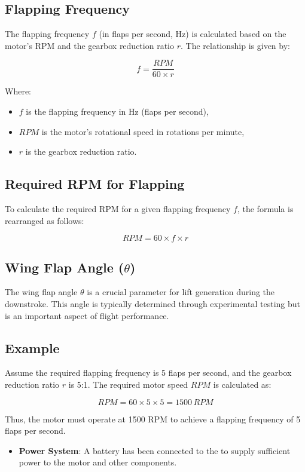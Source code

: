 \subsection{Flapping Frequency}
The flapping frequency $f$ (in flaps per second, Hz) is calculated based on the motor's RPM and the gearbox reduction ratio $r$. The relationship is given by:

\[ f = \frac{RPM}{60 \times r} \]

Where:
\begin{itemize}
    \item $f$ is the flapping frequency in Hz (flaps per second),
    \item $RPM$ is the motor's rotational speed in rotations per minute,
    \item $r$ is the gearbox reduction ratio.
\end{itemize}

\subsection{Required RPM for Flapping}
To calculate the required RPM for a given flapping frequency $f$, the formula is rearranged as follows:

\[ RPM = 60 \times f \times r \]

\subsection{Wing Flap Angle ($\theta$)}
The wing flap angle $\theta$ is a crucial parameter for lift generation during the downstroke. This angle is typically determined through experimental testing but is an important aspect of flight performance.

\subsection{Example}
Assume the required flapping frequency is 5 flaps per second, and the gearbox reduction ratio $r$ is 5:1. The required motor speed $RPM$ is calculated as:

\[ RPM = 60 \times 5 \times 5 = 1500\,RPM \]

Thus, the motor must operate at 1500 RPM to achieve a flapping frequency of 5 flaps per second.

\begin{itemize}
    \item \textbf{Power System}: A \lipo battery has been connected to the \esc to supply sufficient power to the motor and other components.
\end{itemize}

